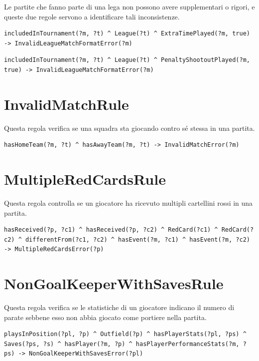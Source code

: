 \documentclass[11pt]{report} %
\begin{document}
Le partite che fanno parte di una lega non possono avere supplementari o rigori, e queste due regole servono a identificare tali inconsistenze.

\begin{lstlisting}[language=SWRL]
includedInTournament(?m, ?t) ^ League(?t) ^ ExtraTimePlayed(?m, true) -> InvalidLeagueMatchFormatError(?m)
\end{lstlisting}

\begin{lstlisting}[language=SWRL]
includedInTournament(?m, ?t) ^ League(?t) ^ PenaltyShootoutPlayed(?m, true) -> InvalidLeagueMatchFormatError(?m)
\end{lstlisting}

\section{InvalidMatchRule}

Questa regola verifica se una squadra sta giocando contro sé stessa in una partita.

\begin{lstlisting}[language=SWRL]
hasHomeTeam(?m, ?t) ^ hasAwayTeam(?m, ?t) -> InvalidMatchError(?m)
\end{lstlisting}

\section{MultipleRedCardsRule}

Questa regola controlla se un giocatore ha ricevuto multipli cartellini rossi in una partita.

\begin{lstlisting}[language=SWRL]
hasReceived(?p, ?c1) ^ hasReceived(?p, ?c2) ^ RedCard(?c1) ^ RedCard(?c2) ^ differentFrom(?c1, ?c2) ^ hasEvent(?m, ?c1) ^ hasEvent(?m, ?c2) -> MultipleRedCardsError(?p)
\end{lstlisting}

\section{NonGoalKeeperWithSavesRule}

Questa regola verifica se le statistiche di un giocatore indicano il numero di parate sebbene esso non abbia giocato come portiere nella partita.

\begin{lstlisting}[language=SWRL]
playsInPosition(?pl, ?p) ^ Outfield(?p) ^ hasPlayerStats(?pl, ?ps) ^ Saves(?ps, ?s) ^ hasPlayer(?m, ?p) ^ hasPlayerPerformanceStats(?m, ?ps) -> NonGoalKeeperWithSavesError(?pl)
\end{lstlisting}
\end{document}
